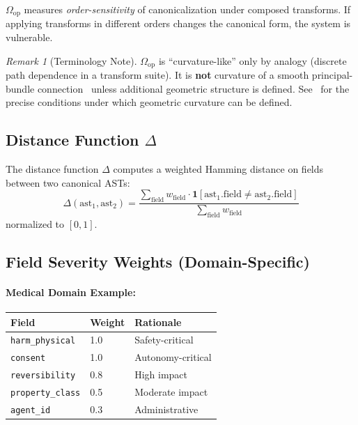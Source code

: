 \documentclass[11pt,letterpaper]{article}
\theoremstyle{definition}
\theoremstyle{remark}
\newtheorem{remark}[theorem]{Remark}
\begin{document}
$\Omega_{\mathrm{op}}$ measures \emph{order-sensitivity} of canonicalization under composed transforms. If applying transforms in different orders changes the canonical form, the system is vulnerable.

\begin{remark}[Terminology Note]
$\Omega_{\mathrm{op}}$ is ``curvature-like'' only by analogy (discrete path dependence in a transform suite). It is \textbf{not} curvature of a smooth principal-bundle connection~\cite{kobayashi1963i,kobayashi1969ii} unless additional geometric structure is defined. See~\cite{bond2025eov} for the precise conditions under which geometric curvature can be defined.
\end{remark}

\subsection{Distance Function $\Delta$}

The distance function $\Delta$ computes a weighted Hamming distance on fields between two canonical ASTs:
\[
\Delta(\text{ast}_1, \text{ast}_2) = \frac{\sum_{\text{field}} w_{\text{field}} \cdot \mathbf{1}[\text{ast}_1.\text{field} \neq \text{ast}_2.\text{field}]}{\sum_{\text{field}} w_{\text{field}}}
\]
normalized to $[0,1]$.

\subsection{Field Severity Weights (Domain-Specific)}

\paragraph{Medical Domain Example:}
\begin{table}[h]
\centering
\begin{tabular}{@{}lll@{}}
\toprule
\textbf{Field} & \textbf{Weight} & \textbf{Rationale} \\
\midrule
\texttt{harm\_physical} & 1.0 & Safety-critical \\
\texttt{consent} & 1.0 & Autonomy-critical \\
\texttt{reversibility} & 0.8 & High impact \\
\texttt{property\_class} & 0.5 & Moderate impact \\
\texttt{agent\_id} & 0.3 & Administrative \\
\bottomrule
\end{tabular}
\end{table}
\end{document}
